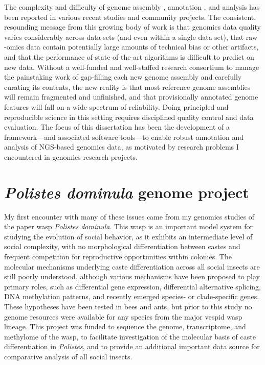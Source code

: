 The complexity and difficulty of genome assembly \cite{Assemblathon1,Assemblathon2,GAGE,QUAST}, annotation \cite{EGASP,Eilbeck,DentonFly}, and analysis \cite{PigWatson,RnaSeqTrim,RnaSeqTrim2} has been reported in various recent studies and community projects.
The consistent, resounding message from this growing body of work is that genomics data quality varies considerably across data sets (and even within a single data set), that raw -omics data contain potentially large amounts of technical bias or other artifacts, and that the performance of state-of-the-art algorithms is difficult to predict on new data.
Without a well-funded and well-staffed research consortium to manage the painstaking work of gap-filling each new genome assembly and carefully curating its contents, the new reality is that most reference genome assemblies will remain fragmented and unfinished, and that provisionally annotated genome features will fall on a wide spectrum of reliability.
Doing principled and reproducible science in this setting requires disciplined quality control and data evaluation.
The focus of this dissertation has been the development of a framework---and associated software tools---to enable robust annotation and analysis of NGS-based genomics data, as motivated by research problems I encountered in genomics research projects.

\section{\textit{Polistes dominula} genome project}

My first encounter with many of these issues came from my genomics studies of the paper wasp \textit{Polistes dominula}.
This wasp is an important model system for studying the evolution of social behavior, as it exhibits an intermediate level of social complexity, with no morphological differentiation between castes and frequent competition for reproductive opportunities within colonies.
The molecular mechanisms underlying caste differentiation across all social insects are still poorly understood, although various mechanisms have been proposed to play primary roles, such as differential gene expression, differential alternative splicing, DNA methylation patterns, and recently emerged species- or clade-specific genes.
These hypotheses have been tested in bees and ants, but prior to this study no genome resources were available for any species from the major vespid wasp lineage.
This project was funded to sequence the genome, transcriptome, and methylome of the wasp, to facilitate investigation of the molecular basis of caste differentiation in \textit{Polistes}, and to provide an additional important data source for comparative analysis of all social insects.

